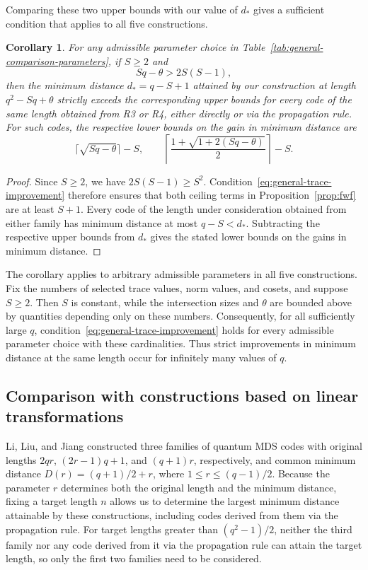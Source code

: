 \documentclass[preprint,12pt,a4paper]{elsarticle}
\newtheorem{corollary}[theorem]{Corollary}
\begin{document}
Comparing these two upper bounds with our value of $d_*$ gives a sufficient condition that applies to all five constructions.

\begin{corollary}\label{cor:general-trace-improvement}
For any admissible parameter choice in Table~\ref{tab:general-comparison-parameters}, if $S\ge2$ and
\begin{equation}\label{eq:general-trace-improvement}
 Sq-\theta>2S(S-1),
\end{equation}
then the minimum distance $d_*=q-S+1$ attained by our construction at length $q^2-Sq+\theta$ strictly exceeds the corresponding upper bounds for every code of the same length obtained from R3 or R4, either directly or via the propagation rule. For such codes, the respective lower bounds on the gain in minimum distance are
\[
 \lceil\sqrt{Sq-\theta}\rceil-S,
 \qquad
 \left\lceil\frac{1+\sqrt{1+2(Sq-\theta)}}2\right\rceil-S.
\]
\end{corollary}

\begin{proof}
Since $S\ge2$, we have $2S(S-1)\ge S^2$. Condition~\eqref{eq:general-trace-improvement} therefore ensures that both ceiling terms in Proposition~\ref{prop:fwf} are at least $S+1$. Every code of the length under consideration obtained from either family has minimum distance at most $q-S<d_*$. Subtracting the respective upper bounds from $d_*$ gives the stated lower bounds on the gains in minimum distance.
\end{proof}

The corollary applies to arbitrary admissible parameters in all five constructions. Fix the numbers of selected trace values, norm values, and cosets, and suppose $S\ge2$. Then $S$ is constant, while the intersection sizes and $\theta$ are bounded above by quantities depending only on these numbers. Consequently, for all sufficiently large $q$, condition~\eqref{eq:general-trace-improvement} holds for every admissible parameter choice with these cardinalities. Thus strict improvements in minimum distance at the same length occur for infinitely many values of $q$.

\subsection{Comparison with constructions based on linear transformations}

Li, Liu, and Jiang \cite[Theorems~4.4--4.6 and Corollary~4.9]{LiLiuJiang2026} constructed three families of quantum MDS codes with original lengths $2qr$, $(2r-1)q+1$, and $(q+1)r$, respectively, and common minimum distance $D(r)=(q+1)/2+r$, where $1\le r\le(q-1)/2$. Because the parameter $r$ determines both the original length and the minimum distance, fixing a target length $n$ allows us to determine the largest minimum distance attainable by these constructions, including codes derived from them via the propagation rule. For target lengths greater than $(q^2-1)/2$, neither the third family nor any code derived from it via the propagation rule can attain the target length, so only the first two families need to be considered.
\end{document}
